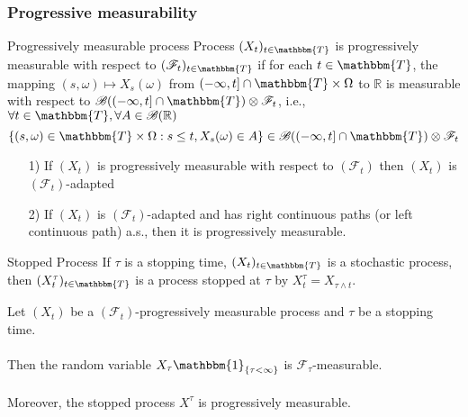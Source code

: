 \documentclass[12pt,a4paper]{article}
\newcommand{\R}{\mathbb{R}}
\begin{document}
\subsubsection{Progressive measurability}
\begin{definition}{Progressively measurable process}{}
    Process $(X_t)_{t\in\mathbbm{T}}$ is progressively measurable with respect to $(\mathscr{F}_t)_{t\in\mathbbm{T}}$ if for each $t\in\mathbbm{T}$, the mapping $(s,\omega)\mapsto X_s(\omega)$ from $(-\infty,t]\cap\mathbbm{T}\times \Omega$ to $\R$ is measurable with respect to $\mathscr{B}((-\infty,t]\cap\mathbbm{T})\otimes \mathscr{F}_t$, i.e., $\forall t\in\mathbbm{T}, \forall A\in\mathscr{B}(\R)$
    $$
    \{(s,\omega)\in\mathbbm{T}\times\Omega:s\le t, X_s(\omega)\in A\}\in \mathscr{B}((-\infty,t]\cap\mathbbm{T})\otimes\mathscr{F}_t
    $$
\end{definition}
\begin{proposition}{}{}
    \begin{enumerate}
        \item[1)] If $(X_t)$ is progressively measurable with respect to $(\mathscr{F}_t)$ then $(X_t)$ is $(\mathscr{F}_t)$-adapted
        \item[2)] If $(X_t)$ is $(\mathscr{F}_t)$-adapted and has right continuous paths (or left continuous path) a.s., then it is progressively measurable.
    \end{enumerate}
\end{proposition}
\begin{definition}{Stopped Process}{}
    If $\tau$ is a stopping time, $(X_t)_{t\in \mathbbm{T}}$ is a stochastic process, then $(X_t^\tau)_{t\in\mathbbm{T}}$ is a process stopped at $\tau$ by $X_t^\tau = X_{\tau\wedge t}$.
\end{definition}
\begin{theorem}{}{}
    Let $(X_t)$ be a $(\mathscr{F}_t)$-progressively measurable process and $\tau$ be a stopping time.\\
    \\
    Then the random variable $X_\tau\mathbbm{1}_{\{\tau<\infty\}}$ is $\mathscr{F}_\tau$-measurable.\\
    \\
    Moreover, the stopped process $X^\tau$ is progressively measurable.
\end{theorem}
\pagebreak
\end{document}
